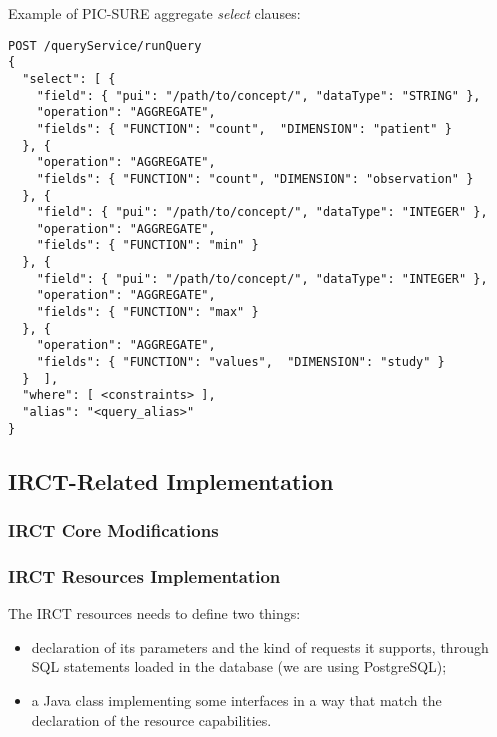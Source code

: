 Example of PIC-SURE aggregate \emph{select} clauses:
\begin{verbatim}
POST /queryService/runQuery
{
  "select": [ {
    "field": { "pui": "/path/to/concept/", "dataType": "STRING" },
    "operation": "AGGREGATE",
    "fields": { "FUNCTION": "count",  "DIMENSION": "patient" }
  }, {
    "operation": "AGGREGATE",
    "fields": { "FUNCTION": "count", "DIMENSION": "observation" }
  }, {
    "field": { "pui": "/path/to/concept/", "dataType": "INTEGER" },
    "operation": "AGGREGATE",
    "fields": { "FUNCTION": "min" }
  }, {
    "field": { "pui": "/path/to/concept/", "dataType": "INTEGER" },
    "operation": "AGGREGATE",
    "fields": { "FUNCTION": "max" }
  }, {
    "operation": "AGGREGATE",
    "fields": { "FUNCTION": "values",  "DIMENSION": "study" }
  }  ],
  "where": [ <constraints> ],
  "alias": "<query_alias>"
}
\end{verbatim}




\subsection{IRCT-Related Implementation}

\subsubsection{IRCT Core Modifications}


\subsubsection{IRCT Resources Implementation}

The IRCT resources needs to define two things:
\begin{itemize}
    \item declaration of its parameters and the kind of requests it supports, through SQL statements loaded in the database (we are using PostgreSQL);
    \item a Java class implementing some interfaces in a way that match the declaration of the resource capabilities.
\end{itemize}


